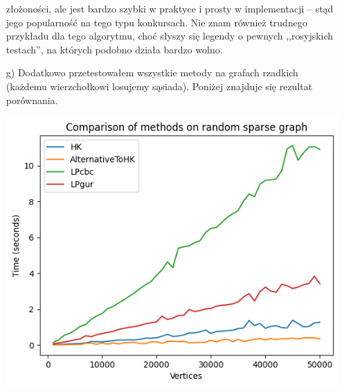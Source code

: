 \documentclass[12pt]{article}
\begin{document}
\begin{itemize}
                  złożoności, ale jest bardzo szybki w praktyce i prosty w
                  implementacji -- stąd jego popularność na tego typu
                  konkursach. Nie znam również trudnego przykładu dla tego
                  algorytmu, choć słyszy się legendy o pewnych ,,rosyjskich
                  testach'', na których podobno działa bardzo wolno.
        \item[g)] Dodatkowo przetestowałem wszystkie metody na grafach rzadkich
                  (każdemu wierzchołkowi losujemy sąsiada). Poniżej znajduje
                  się rezultat porównania.
                  \begin{center}
                      \includegraphics[scale = 0.8]{image_03.png}
                  \end{center}
    \end{itemize}
\end{document}

